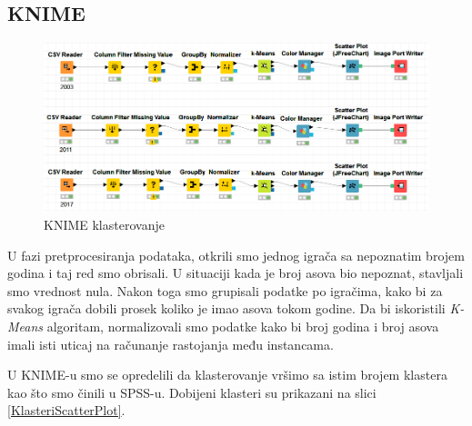 \documentclass[a4paper]{article}
\begin{document}
\subsection{KNIME}

\begin{figure}[H]
	\begin{center}
		\includegraphics[scale=0.60]{Klasterovanje/KNIME_Cvorovi.png}
	\end{center}
	\caption{KNIME klasterovanje}
	\label{fig:KNIME_CvoroviKlasterovanje}
\end{figure}

U fazi pretprocesiranja podataka, otkrili smo jednog igrača sa nepoznatim brojem godina i taj red smo obrisali. U situaciji kada je broj asova bio nepoznat, stavljali smo vrednost nula. Nakon toga smo grupisali podatke po igračima, kako bi za svakog igrača dobili prosek koliko je imao asova tokom godine. Da bi iskoristili \textit{K-Means} algoritam, normalizovali smo podatke kako bi broj godina i broj asova imali isti uticaj na računanje rastojanja među instancama.  

U KNIME-u smo se opredelili da klasterovanje vršimo sa istim brojem klastera kao što smo činili u SPSS-u. Dobijeni klasteri su prikazani na slici \ref{KlasteriScatterPlot}.
\end{document}
